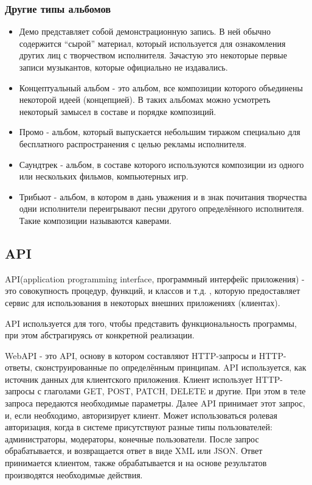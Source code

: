 \subsubsection{Другие типы альбомов}
\label{sub:domain:music_album:other_types_classification}
\begin{itemize}
  \item Демо представляет собой демонстрационную запись. В ней обычно содержится “сырой” материал, который используется для ознакомления других лиц с творчеством исполнителя. Зачастую это некоторые первые записи музыкантов, которые официально не издавались.
  \item Концептуальный альбом - это альбом, все композиции которого объединены некоторой идеей (концепцией). В таких альбомах можно усмотреть некоторый замысел в составе и порядке композиций.
  \item Промо - альбом, который выпускается небольшим тиражом специально для бесплатного распространения с целью рекламы исполнителя.
  \item Саундтрек - альбом, в составе которого используются композиции из одного или нескольких фильмов, компьютерных игр.
  \item Трибьют - альбом, в котором в дань уважения и в знак почитания творчества одни исполнители переигрывают песни другого определённого исполнителя. Такие композиции называются каверами.
\end{itemize}

\subsection{API}
\label{sub:domain:api}
API(application programming interface, программный интерфейс приложения) - это совокупность процедур, функций, и классов и т.д. , которую предоставляет сервис для использования в некоторых внешних приложениях (клиентах).

API используется для того, чтобы представить функциональность программы, при этом абстрагируясь от конкретной реализации.

WebAPI - это API, основу в котором составляют HTTP-запросы и HTTP-ответы, сконструированные по определённым принципам. API используется, как источник данных для клиентского приложения. Клиент использует HTTP-запросы с глаголами GET, POST, PATCH, DELETE и другие. При этом в теле запроса передаются необходимые параметры. Далее API принимает этот запрос, и, если необходимо, авторизирует клиент. Может использоваться ролевая авторизация, когда в системе присутствуют разные типы пользователей: администраторы, модераторы, конечные пользователи. После запрос обрабатывается, и возвращается ответ в виде XML или JSON. Ответ принимается клиентом, также обрабатывается и на основе результатов производятся необходимые действия.
